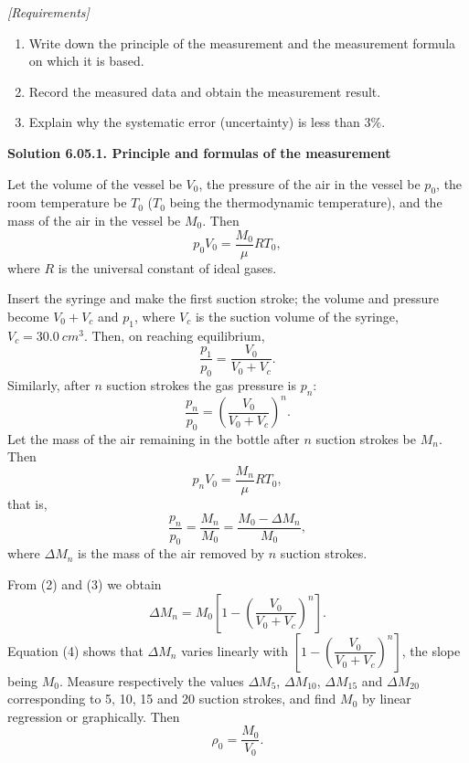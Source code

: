 \noindent\textit{[Requirements]}
\begin{enumerate}[label=(\arabic*),leftmargin=2.2em,itemsep=1pt,topsep=2pt]
\item Write down the principle of the measurement and the measurement formula on which it is based.
\item Record the measured data and obtain the measurement result.
\item Explain why the systematic error (uncertainty) is less than $3\%$.
\end{enumerate}

\medskip
\noindent\textbf{Solution 6.05.}\quad \textbf{1. Principle and formulas of the measurement}

Let the volume of the vessel be $V_0$, the pressure of the air in the vessel be $p_0$, the room temperature be $T_0$ ($T_0$ being the thermodynamic temperature), and the mass of the air in the vessel be $M_0$. Then
\begin{equation}\tag{1}
p_0V_0=\frac{M_0}{\mu}RT_0,
\end{equation}
where $R$ is the universal constant of ideal gases.

Insert the syringe and make the first suction stroke; the volume and pressure become $V_0+V_c$ and $p_1$, where $V_c$ is the suction volume of the syringe, $V_c=\SI{30.0}{cm^3}$. Then, on reaching equilibrium,
\begin{equation*}
\frac{p_1}{p_0}=\frac{V_0}{V_0+V_c}.
\end{equation*}
Similarly, after $n$ suction strokes the gas pressure is $p_n$:
\begin{equation}\tag{2}
\frac{p_n}{p_0}=\left(\frac{V_0}{V_0+V_c}\right)^{n}.
\end{equation}
Let the mass of the air remaining in the bottle after $n$ suction strokes be $M_n$. Then
\begin{equation*}
p_nV_0=\frac{M_n}{\mu}RT_0,
\end{equation*}
that is,
\begin{equation}\tag{3}
\frac{p_n}{p_0}=\frac{M_n}{M_0}=\frac{M_0-\Delta M_n}{M_0},
\end{equation}
where $\Delta M_n$ is the mass of the air removed by $n$ suction strokes.

From (2) and (3) we obtain
\begin{equation}\tag{4}
\Delta M_n=M_0\left[1-\left(\frac{V_0}{V_0+V_c}\right)^{n}\right].
\end{equation}
Equation (4) shows that $\Delta M_n$ varies linearly with $\left[1-\left(\dfrac{V_0}{V_0+V_c}\right)^{n}\right]$, the slope being $M_0$. Measure respectively the values $\Delta M_5$, $\Delta M_{10}$, $\Delta M_{15}$ and $\Delta M_{20}$ corresponding to 5, 10, 15 and 20 suction strokes, and find $M_0$ by linear regression or graphically. Then
\begin{equation}\tag{5}
\rho_0=\frac{M_0}{V_0}.
\end{equation}

